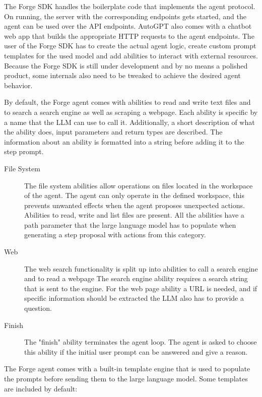 \documentclass[../main.tex]{subfiles}
\begin{document}
The Forge SDK handles the boilerplate code that implements the agent protocol.
On running, the server with the corresponding endpoints gets started, and the agent can be used over the API endpoints.
AutoGPT also comes with a chatbot web app that builds the appropriate HTTP requests to the agent endpoints.
The user of the Forge SDK has to create the actual agent logic, create custom prompt templates for the used model and add abilities to interact with external resources.
Because the Forge SDK is still under development and by no means a polished product, some internals also need to be tweaked to achieve the desired agent behavior.

By default, the Forge agent comes with abilities to read and write text files and to search a search engine as well as scraping a webpage.
Each ability is specific by a name that the LLM can use to call it.
Additionally, a short description of what the ability does, input parameters and return types are described.
The information about an ability is formatted into a string before adding it to the step prompt.

\begin{description}
    \item[File System] The file system abilities allow operations on files located in the workspace of the agent.
        The agent can only operate in the defined workspace, this prevents unwanted effects when the agent proposes unexpected actions.
        Abilities to read, write and list files are present.
        All the abilities have a path parameter that the large language model has to populate when generating a step proposal with actions from this category.
    \item[Web] The web search functionality is split up into abilities to call a search engine and to read a webpage
        The search engine ability requires a search string that is sent to the engine.
        For the web page ability a URL is needed, and if specific information should be extracted the LLM also has to provide a question.
    \item[Finish] The "finish" ability terminates the agent loop.
        The agent is asked to choose this ability if the initial user prompt can be answered and give a reason.
\end{description}

The Forge agent comes with a built-in template engine that is used
to populate the prompts before sending them to the large language model.
Some templates are included by default:
\end{document}
